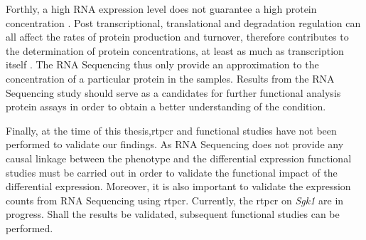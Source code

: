 Forthly, a high RNA expression level does not guarantee a high protein concentration \citep{Vogel2012}.
Post transcriptional, translational and degradation regulation can all affect the rates of protein production and turnover, therefore contributes to the determination of protein concentrations, at least as much as transcription itself \citep{Vogel2012}.
The RNA Sequencing thus only provide an approximation to the concentration of a particular protein in the samples.
Results from the RNA Sequencing study should serve as a candidates for further functional analysis protein assays in order to obtain a better understanding of the condition.

Finally, at the time of this thesis,\gls{rtpcr} and functional studies have not been performed to  validate our findings.
As RNA Sequencing does not provide any causal linkage between the phenotype and the differential expression functional studies must be carried out in order to validate the functional impact of the differential expression. 
Moreover, it is also important to validate the expression counts from RNA Sequencing using \gls{rtpcr}.
Currently, the \gls{rtpcr} on \textit{Sgk1} are in progress. 
Shall the results be validated, subsequent functional studies can be performed. 

\newpage
